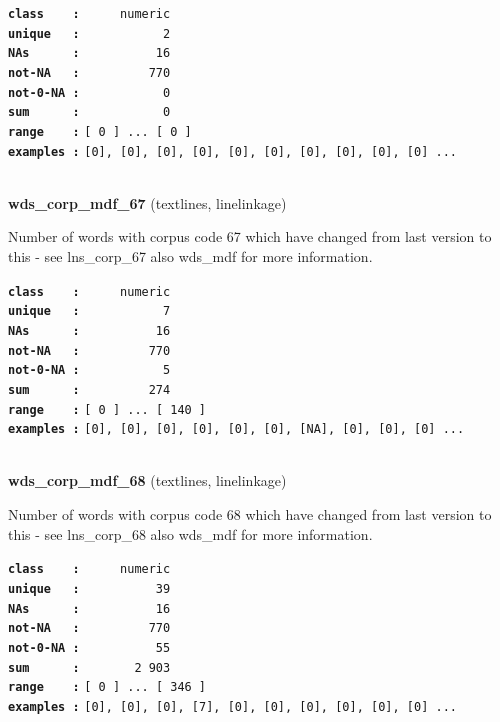 \documentclass[]{article}
\begin{document}
\textbf{\texttt{class\ \ \ \ :}} \texttt{~~~~~numeric}\\
\textbf{\texttt{unique\ \ \ :}} \texttt{~~~~~~~~~~~2}\\
\textbf{\texttt{NAs\ \ \ \ \ \ :}} \texttt{~~~~~~~~~~16}\\
\textbf{\texttt{not-NA\ \ \ :}} \texttt{~~~~~~~~~770}\\
\textbf{\texttt{not-0-NA\ :}} \texttt{~~~~~~~~~~~0}\\
\textbf{\texttt{sum\ \ \ \ \ \ :}} \texttt{~~~~~~~~~~~0}\\
\textbf{\texttt{range\ \ \ \ :}}
\texttt{{[}\ 0\ {]}\ ...\ {[}\ 0\ {]}}\\
\textbf{\texttt{examples\ :}}
\texttt{{[}0{]},\ {[}0{]},\ {[}0{]},\ {[}0{]},\ {[}0{]},\ {[}0{]},\ {[}0{]},\ {[}0{]},\ {[}0{]},\ {[}0{]}\ ...}\\

~

\textbf{wds\_corp\_mdf\_67} (textlines, linelinkage)

Number of words with corpus code 67 which have changed from last version
to this - see lns\_corp\_67 also wds\_mdf for more information.

\textbf{\texttt{class\ \ \ \ :}} \texttt{~~~~~numeric}\\
\textbf{\texttt{unique\ \ \ :}} \texttt{~~~~~~~~~~~7}\\
\textbf{\texttt{NAs\ \ \ \ \ \ :}} \texttt{~~~~~~~~~~16}\\
\textbf{\texttt{not-NA\ \ \ :}} \texttt{~~~~~~~~~770}\\
\textbf{\texttt{not-0-NA\ :}} \texttt{~~~~~~~~~~~5}\\
\textbf{\texttt{sum\ \ \ \ \ \ :}} \texttt{~~~~~~~~~274}\\
\textbf{\texttt{range\ \ \ \ :}}
\texttt{{[}\ 0\ {]}\ ...\ {[}\ 140\ {]}}\\
\textbf{\texttt{examples\ :}}
\texttt{{[}0{]},\ {[}0{]},\ {[}0{]},\ {[}0{]},\ {[}0{]},\ {[}0{]},\ {[}NA{]},\ {[}0{]},\ {[}0{]},\ {[}0{]}\ ...}\\

~

\textbf{wds\_corp\_mdf\_68} (textlines, linelinkage)

Number of words with corpus code 68 which have changed from last version
to this - see lns\_corp\_68 also wds\_mdf for more information.

\textbf{\texttt{class\ \ \ \ :}} \texttt{~~~~~numeric}\\
\textbf{\texttt{unique\ \ \ :}} \texttt{~~~~~~~~~~39}\\
\textbf{\texttt{NAs\ \ \ \ \ \ :}} \texttt{~~~~~~~~~~16}\\
\textbf{\texttt{not-NA\ \ \ :}} \texttt{~~~~~~~~~770}\\
\textbf{\texttt{not-0-NA\ :}} \texttt{~~~~~~~~~~55}\\
\textbf{\texttt{sum\ \ \ \ \ \ :}} \texttt{~~~~~~~2~903}\\
\textbf{\texttt{range\ \ \ \ :}}
\texttt{{[}\ 0\ {]}\ ...\ {[}\ 346\ {]}}\\
\textbf{\texttt{examples\ :}}
\texttt{{[}0{]},\ {[}0{]},\ {[}0{]},\ {[}7{]},\ {[}0{]},\ {[}0{]},\ {[}0{]},\ {[}0{]},\ {[}0{]},\ {[}0{]}\ ...}\\
\end{document}

